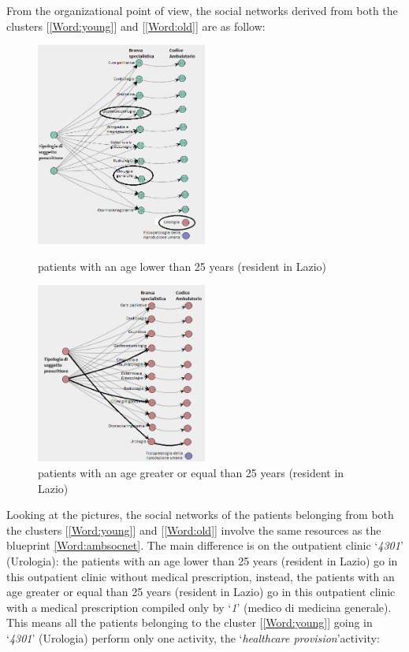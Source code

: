 \clearpage
\noindent
From the organizational point of view, the social networks derived from both the clusters [\ref{Word:young}] and [\ref{Word:old}] are as follow:
\begin{figure} [htbp]
\centering
\includegraphics[width=0.5\textwidth]{AmbulatoriSocialNetworkYoungs}
\caption{patients with an age lower than 25 years (resident in Lazio)}
\centering
\includegraphics[width=0.5\textwidth]{AmbulatoriSocialNetworkOlds}
\caption{patients with an age greater or equal than 25 years (resident in Lazio)}
\end{figure} \newline
Looking at the pictures, the social networks of the patients belonging from both the clusters [\ref{Word:young}] and [\ref{Word:old}] involve the same resources as the blueprint \ref{Word:ambsocnet}. The main difference is on the outpatient clinic `\textit{4301}' (Urologia): the patients with an age lower than 25 years (resident in Lazio) go in this outpatient clinic without medical prescription, instead, the patients with an age greater or equal than 25 years (resident in Lazio) go in this outpatient clinic with a medical prescription compiled only by `\textit{1}' (medico di medicina generale). This means all the patients belonging to the cluster [\ref{Word:young}] going in `\textit{4301}' (Urologia) perform only one activity, the `\textit{healthcare provision}'activity:
